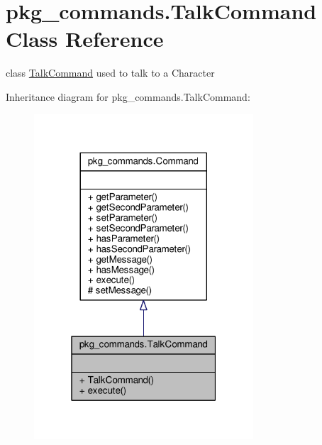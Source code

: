 \hypertarget{classpkg__commands_1_1TalkCommand}{\section{pkg\-\_\-commands.\-Talk\-Command Class Reference}
\label{classpkg__commands_1_1TalkCommand}
}


class \hyperlink{classpkg__commands_1_1TalkCommand}{Talk\-Command} used to talk to a Character  




Inheritance diagram for pkg\-\_\-commands.\-Talk\-Command\-:
\nopagebreak
\begin{figure}[H]
\begin{center}
\leavevmode
\includegraphics[width=232pt]{classpkg__commands_1_1TalkCommand__inherit__graph}
\end{center}
\end{figure}


